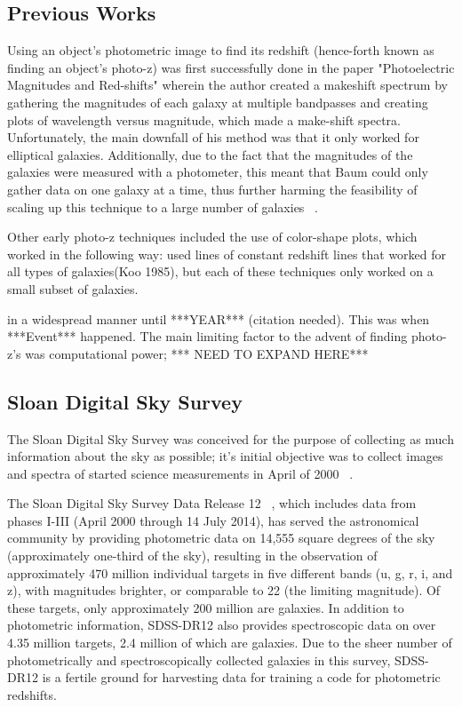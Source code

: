 \documentclass[fleqn,usenatbib]{mnras}
\begin{document}
\subsection{Previous Works}
 \label{sec:prev_work}
Using an object's photometric image to find its redshift (hence-forth known as finding an object's photo-z) was first successfully done in the paper "Photoelectric Magnitudes and Red-shifts" wherein the author created a makeshift spectrum by gathering the magnitudes of each galaxy at multiple bandpasses and creating plots of wavelength versus magnitude, which made a make-shift spectra.  Unfortunately, the main downfall of his method was that it only worked for elliptical galaxies.  Additionally, due to the fact that the magnitudes of the galaxies were measured with a photometer, this meant that Baum could only gather data on one galaxy at a time, thus further harming the feasibility of scaling up this technique to a large number of galaxies ~\citep{baum_photoelectric_1962}.

Other early photo-z techniques included the use of color-shape plots, which worked in the following way: used lines of constant redshift lines  that worked for all types of galaxies(Koo 1985), but each of these techniques only worked on a small subset of galaxies.

in a widespread manner until ***YEAR*** (citation needed).  This was when ***Event*** happened.  The main limiting factor to the advent of finding photo-z's was computational power; 
*** NEED TO EXPAND HERE***
 
\subsection{Sloan Digital Sky Survey}
  \label{sec:sdss}
  
The Sloan Digital Sky Survey was conceived for the purpose of collecting as much information about the sky as possible; it's initial objective was to collect images and spectra of   started science measurements in April of 2000 ~\citep{york_sloan_2000}.

The Sloan Digital Sky Survey Data Release 12 ~\citep[SDSS-DR12;][]{alam_eleventh_2015}, which includes data from phases I-III (April 2000 through 14 July 2014), has served the astronomical community by providing photometric data on 14,555 square degrees of the sky (approximately one-third of the sky), resulting in the observation of approximately 470 million individual targets in five different bands (u, g, r, i, and z), with magnitudes brighter, or comparable to 22 (the limiting magnitude). Of these targets, only approximately 200 million are galaxies.  In addition to photometric information, SDSS-DR12 also provides spectroscopic data on over 4.35 million targets, 2.4 million of which are galaxies.  Due to the sheer number of photometrically and spectroscopically collected galaxies in this survey, SDSS-DR12 is a fertile ground for harvesting data for training a code for photometric redshifts.
  
\end{document}
